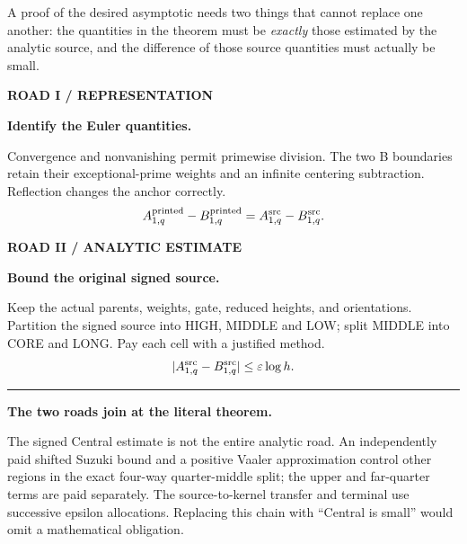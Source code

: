 \documentclass[11pt,letterpaper]{article}
\newcommand{\kicker}[1]{{\sffamily\small\bfseries\color{pine}\MakeUppercase{#1}}}
\begin{document}
A proof of the desired asymptotic needs two things that cannot replace
one another: the quantities in the theorem must be \emph{exactly} those
estimated by the analytic source, and the difference of those source
quantities must actually be small.

\vspace{6pt}
\begin{minipage}[t]{0.48\linewidth}
\begin{quietbox}
\kicker{Road I / representation}\par
\textbf{Identify the Euler quantities.}\par
Convergence and nonvanishing permit primewise division. The two
B boundaries retain their exceptional-prime weights and an infinite
centering subtraction. Reflection changes the anchor correctly.
\[A_{1,q}^{\rm printed}-B_{1,q}^{\rm printed}
  =A_{1,q}^{\rm src}-B_{1,q}^{\rm src}.\]
\end{quietbox}
\end{minipage}\hfill
\begin{minipage}[t]{0.48\linewidth}
\begin{quietbox}
\kicker{Road II / analytic estimate}\par
\textbf{Bound the original signed source.}\par
Keep the actual parents, weights, gate, reduced heights, and orientations.
Partition the signed source into HIGH, MIDDLE and LOW; split MIDDLE into
CORE and LONG. Pay each cell with a justified method.
\[|A_{1,q}^{\rm src}-B_{1,q}^{\rm src}|
 \le\varepsilon\log h.\]
\end{quietbox}
\end{minipage}

\begin{center}
\color{pine}\rule{0.50\linewidth}{0.6pt}\color{ink}\par\vspace{6pt}
{\large\bfseries The two roads join at the literal theorem.}\par
\end{center}

The signed Central estimate is not the entire analytic road. An independently
paid shifted Suzuki bound and a positive Vaaler approximation control other
regions in the exact four-way quarter-middle split; the upper and far-quarter
terms are paid separately. The source-to-kernel transfer and terminal use
successive epsilon allocations. Replacing this chain with ``Central is small''
would omit a mathematical obligation.
\end{document}
